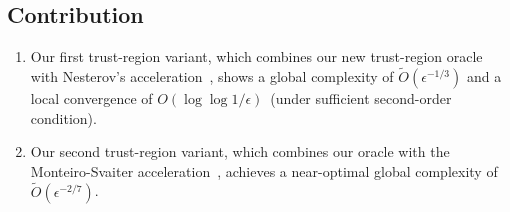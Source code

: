 \documentclass{mcom-l}
\numberwithin{equation}{section}
\begin{document}
\subsection{Contribution}
\begin{enumerate}
    \item Our first trust-region variant, which combines our new trust-region oracle with Nesterov's acceleration~\citet{nesterov2008accelerating}, shows a global complexity of $\tilde O(\epsilon^{-1/3})$ and a local convergence of $O(\log\log 1/\epsilon)$~(under sufficient second-order condition).
    \item Our second trust-region variant, which combines our oracle with the Monteiro-Svaiter acceleration~\citet{monteiro2013accelerated}, achieves a near-optimal global complexity of $\tilde O(\epsilon^{-2/7})$.
\end{enumerate}
\clearpage
{}



\end{document}
